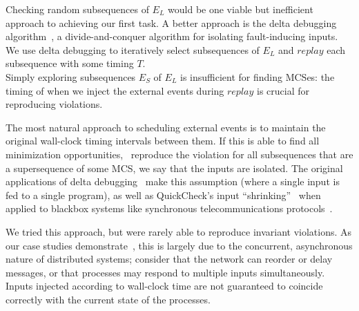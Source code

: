  Checking
random subsequences of $E_L$ would be one viable but inefficient
approach to achieving our first task. A better approach is
the delta debugging algorithm~\cite{Zeller:1999:YMP:318773.318946}, a
divide-and-conquer algorithm for
isolating fault-inducing inputs. We use delta
debugging to iteratively select subsequences of $E_L$ and $replay$ each
subsequence with some timing $T$.\\[0.5ex]
%
 Simply
exploring subsequences $E_S$ of $E_L$ is insufficient for finding
MCSes: the timing of when we inject the external events during $replay$ is crucial for
reproducing violations.

The most natural approach to scheduling
external events is to maintain the original wall-clock timing intervals
between them.
If this is able to find all minimization opportunities,
\ie~reproduce the violation for all
subsequences that are a supersequence of some MCS, we say that the inputs are
isolated. The original applications of delta
debugging~\cite{Zeller:1999:YMP:318773.318946,Zeller:2002:SIF:506201.506206,regehr2012test,burger2011minimizing} make this assumption (where a
single input is fed to a single program), as well as QuickCheck's input ``shrinking''~\cite{claessen2000quickcheck}
when applied to blackbox systems like synchronous
telecommunications protocols~\cite{arts2006testing}.

We tried this approach, but were rarely
able to reproduce invariant violations. As our case studies
demonstrate~\cite{sts2014}, this is largely due
to the concurrent, asynchronous nature of distributed systems; consider that the network
can reorder or delay messages, or that processes may
respond to multiple inputs simultaneously.
Inputs injected according to wall-clock time are not guaranteed to
coincide correctly with the current state of the processes.

